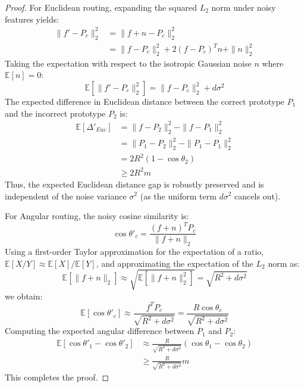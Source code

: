 \documentclass{article}
\theoremstyle{plain}
\theoremstyle{definition}
\theoremstyle{remark}
\begin{document}
\begin{proof}
For Euclidean routing, expanding the squared $L_2$ norm under noisy features yields:
\begin{equation}
\begin{aligned}
\|f' - P_c\|_2^2 &= \|f + n - P_c\|_2^2 \\
&= \|f - P_c\|_2^2 + 2(f - P_c)^T n + \|n\|_2^2
\end{aligned}
\end{equation}
Taking the expectation with respect to the isotropic Gaussian noise $n$ where $\mathbb{E}[n] = 0$:
\begin{equation}
\mathbb{E}[\|f' - P_c\|_2^2] = \|f - P_c\|_2^2 + d \sigma^2
\end{equation}
The expected difference in Euclidean distance between the correct prototype $P_1$ and the incorrect prototype $P_2$ is:
\begin{equation}
\begin{aligned}
\mathbb{E}[\Delta'_{Euc}] &= \|f - P_2\|_2^2 - \|f - P_1\|_2^2 \\
&= \|P_1 - P_2\|_2^2 - \|P_1 - P_1\|_2^2 \\
&= 2R^2(1 - \cos \theta_2) \\
&\ge 2R^2 m
\end{aligned}
\end{equation}
Thus, the expected Euclidean distance gap is robustly preserved and is independent of the noise variance $\sigma^2$ (as the uniform term $d \sigma^2$ cancels out).

For Angular routing, the noisy cosine similarity is:
\begin{equation}
\cos \theta'_c = \frac{(f + n)^T P_c}{\|f + n\|_2}
\end{equation}
Using a first-order Taylor approximation for the expectation of a ratio, $\mathbb{E}[X/Y] \approx \mathbb{E}[X]/\mathbb{E}[Y]$, and approximating the expectation of the $L_2$ norm as:
\begin{equation}
\mathbb{E}[\|f + n\|_2] \approx \sqrt{\mathbb{E}[\|f + n\|_2^2]} = \sqrt{R^2 + d\sigma^2}
\end{equation}
we obtain:
\begin{equation}
\mathbb{E}[\cos \theta'_c] \approx \frac{f^T P_c}{\sqrt{R^2 + d \sigma^2}} = \frac{R \cos \theta_c}{\sqrt{R^2 + d \sigma^2}}
\end{equation}
Computing the expected angular difference between $P_1$ and $P_2$:
\begin{equation}
\begin{aligned}
\mathbb{E}[\cos \theta'_1 - \cos \theta'_2] &\approx \frac{R}{\sqrt{R^2 + d\sigma^2}} (\cos \theta_1 - \cos \theta_2) \\
&\ge \frac{R}{\sqrt{R^2 + d\sigma^2}} m
\end{aligned}
\end{equation}
This completes the proof.
\end{proof}
\end{document}
